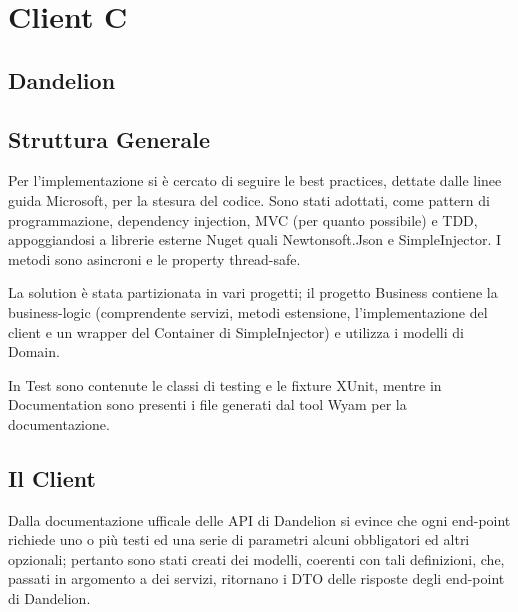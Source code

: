 
\chapter{Client C}

\section{Dandelion}


\section{Struttura Generale}

Per l'implementazione si è cercato di seguire le best practices, dettate dalle linee guida Microsoft, per la stesura del codice.
Sono stati adottati, come pattern di programmazione, dependency injection, MVC (per quanto possibile) e TDD, appoggiandosi a librerie esterne Nuget quali 
Newtonsoft.Json e SimpleInjector. I metodi sono asincroni e le property thread-safe.

La solution è stata partizionata in vari progetti; il progetto Business contiene la business-logic 
(comprendente servizi, metodi estensione, l'implementazione del client e un wrapper del Container di SimpleInjector) e utilizza i modelli di Domain.

In Test sono contenute le classi di testing e le fixture XUnit, mentre in Documentation sono presenti i file generati dal tool Wyam per la documentazione.

\section{Il Client}

Dalla documentazione ufficale delle API di Dandelion si evince che ogni end-point richiede uno o più testi ed una serie di parametri alcuni obbligatori ed altri 
opzionali; 
pertanto sono stati creati dei modelli, coerenti con tali definizioni, che, passati in argomento a dei servizi, ritornano i DTO delle risposte degli end-point di Dandelion.

